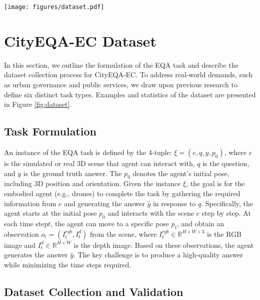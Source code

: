 \begin{figure*}[!htb]
\centering
    \texttt{[image: figures/dataset.pdf]}
\caption{Example questions and dataset statistics of CityEQA-EC.}
\label{fig:dataset}
\end{figure*}

\section{CityEQA-EC Dataset}\label{sec::dataset}
\vspace{-0.2cm}
In this section, we outline the formulation of the EQA task and describe the dataset collection process for CityEQA-EC. To address real-world demands, such as urban governance and public services, we draw upon previous research \cite{majumdar2024openeqa, das2018embodied} to define six distinct task types. Examples and statistics of the dataset are presented in Figure \ref{fig:dataset}. 

\vspace{-0.2cm}

\subsection{Task Formulation}

An instance of the EQA task is defined by the 4-tuple: $\xi =(e,q,y,{{p}_{0}})$, where $e$ is the simulated or real 3D scene that agent can interact with, $q$ is the question, and $y$ is the ground truth answer. The ${{p}_{0}}$ denotes the agent’s initial pose, including 3D position and orientation. Given the instance $\xi $, the goal is for the embodied agent (e.g., drones) to complete the task by gathering the required information from $e$ and generating the answer $\hat{y}$ in response to $q$. Specifically, the agent starts at the initial pose ${{p}_{0}}$ and interacts with the scene $e$ step by step. At each time step$t$, the agent can move to a specific pose ${{p}_{t}}$, and obtain an observation ${{o}_{t}}=(I_{t}^{rgb},I_{t}^{d})$ from the scene, where $I_{t}^{rgb}\in {{\mathbb{R}}^{H\times W\times 3}}$ is the RGB image and $I_{t}^{d}\in {{\mathbb{R}}^{H\times W}}$ is the depth image. Based on these observations, the agent generates the answer $\hat{y}$. The key challenge is to produce a high-quality answer while minimizing the time steps required. 

\subsection{Dataset Collection and Validation}

